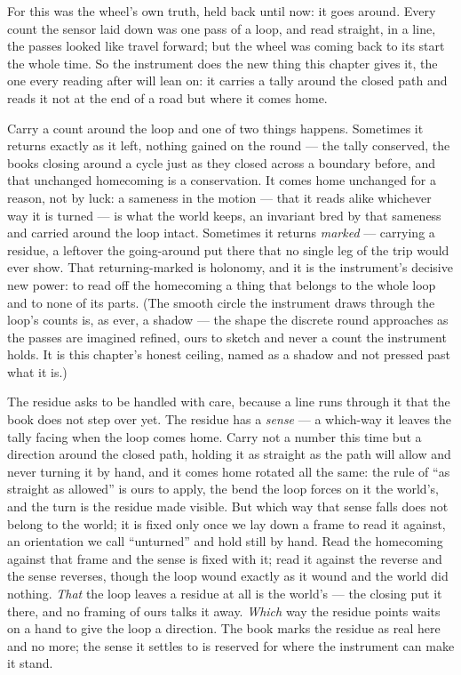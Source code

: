 For this was the wheel's own truth, held back until now: it goes around. Every count the sensor laid down was
one pass of a loop, and read straight, in a line, the passes looked like travel forward; but the wheel was
coming back to its start the whole time. So the instrument does the new thing this chapter gives it, the one
every reading after will lean on: it carries a tally around the closed path and reads it not at the end of a
road but where it comes home.

Carry a count around the loop and one of two things happens. Sometimes it returns exactly as it left, nothing
gained on the round --- the tally conserved, the books closing around a cycle just as they closed across a
boundary before, and that unchanged homecoming is a conservation. It comes home unchanged for a reason, not by
luck: a sameness in the motion --- that it reads alike whichever way it is turned --- is what the world keeps,
an invariant bred by that sameness and carried around the loop intact. Sometimes it returns \emph{marked} ---
carrying a residue, a leftover the going-around put there that no single leg of the trip would ever show. That
returning-marked is holonomy, and it is the instrument's decisive new power: to read off the homecoming a thing
that belongs to the whole loop and to none of its parts. (The smooth circle the instrument draws through the
loop's counts is, as ever, a shadow --- the shape the discrete round approaches as the passes are imagined
refined, ours to sketch and never a count the instrument holds. It is this chapter's honest ceiling, named as a
shadow and not pressed past what it is.)

The residue asks to be handled with care, because a line runs through it that the book does not step over yet.
The residue has a \emph{sense} --- a which-way it leaves the tally facing when the loop comes home. Carry not a
number this time but a direction around the closed path, holding it as straight as the path will allow and
never turning it by hand, and it comes home rotated all the same: the rule of ``as straight as allowed'' is
ours to apply, the bend the loop forces on it the world's, and the turn is the residue made visible. But which
way that sense falls does not belong to the world; it is fixed only once we lay down a frame to read it against, an
orientation we call ``unturned'' and hold still by hand. Read the homecoming against that frame and the sense
is fixed with it; read it against the reverse and the sense reverses, though the loop wound exactly as it wound
and the world did nothing. \emph{That} the loop leaves a residue at all is the world's --- the closing put it
there, and no framing of ours talks it away. \emph{Which} way the residue points waits on a hand to give the
loop a direction. The book marks the residue as real here and no more; the sense it settles to is reserved for
where the instrument can make it stand.

